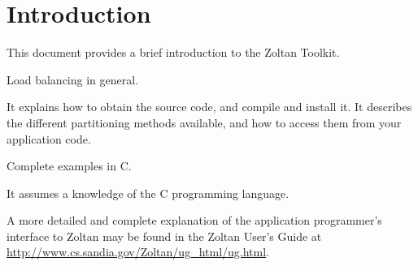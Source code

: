 %
%
\chapter{Introduction}

This document provides a brief introduction to the Zoltan Toolkit.

Load balancing in general.

It explains how to obtain the source code, and compile and install it.
It describes the different partitioning methods available, and how
to access them from your application code.

Complete examples in C.

It assumes a knowledge of the C programming language.

A more detailed and complete explanation of the application
programmer's interface to Zoltan may be found 
in the Zoltan User's Guide at
\url{http://www.cs.sandia.gov/Zoltan/ug_html/ug.html}.

